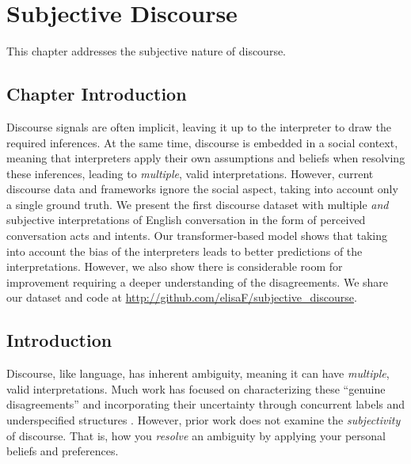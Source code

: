 \chapter{Subjective Discourse}
\label{ch:subjective}

This chapter addresses the subjective nature of discourse. 

\section{Chapter Introduction}
Discourse signals are often implicit, leaving it up to the interpreter to draw the required inferences. At the same time, discourse is embedded in a social context, meaning that interpreters apply their own assumptions and beliefs when resolving these inferences, leading to \emph{multiple}, valid interpretations. However, current discourse data and frameworks ignore the social aspect, taking into account only a single ground truth. We present the first discourse dataset with multiple \emph{and} subjective interpretations of English conversation in the form of perceived conversation acts and intents. Our transformer-based model shows that taking into account the bias of the interpreters leads to better predictions of the interpretations. However, we also show there is considerable room for improvement requiring a deeper understanding of the disagreements. We share our dataset and code at \url{http://github.com/elisaF/subjective_discourse}.

\section{Introduction}
\label{intro}

Discourse, like language, has inherent ambiguity, meaning it can have \emph{multiple}, valid interpretations. Much work has focused on characterizing these ``genuine disagreements'' \cite{Poesio:2019,Das:2017,Asher:2003,Webber:2019b} and incorporating their uncertainty through concurrent labels \cite{Rohde:2018} and underspecified structures \cite{Hanneforth:2003}. However, prior work does not examine the \emph{subjectivity} of discourse. That is, how you \emph{resolve} an ambiguity by applying your personal beliefs and preferences. 

